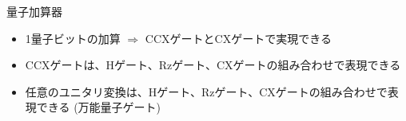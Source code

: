 \begin{frame}[t,fragile]{量子加算器}
  \begin{itemize}
  \item 1量子ビットの加算 $\Rightarrow$ CCXゲートとCXゲートで実現できる
    \begin{center}
    \end{center}
  \item CCXゲートは、Hゲート、Rzゲート、CXゲートの組み合わせで表現できる
  \item 任意のユニタリ変換は、Hゲート、Rzゲート、CXゲートの組み合わせで表現できる (万能量子ゲート)
  \end{itemize}
\end{frame}
